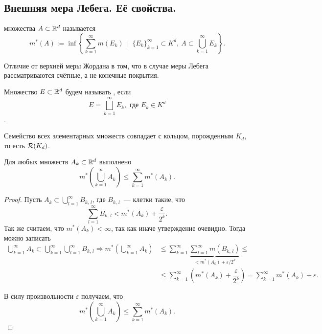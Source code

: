 \newpage
{}

\subsection{Внешняя мера Лебега. Её свойства.}

\begin{definition}
     множества $A\subset\mathbb{R}^d$ называется
    \[
        m^*(A):=\inf \left\{\sum_{k=1}^{\infty}m(E_k)\ \mid\ \{E_k\}_{k=1}^{\infty}\subset K^d,\ A\subset\bigcup_{k=1}^{\infty}E_k\right\}.
    \]
\end{definition}

\begin{remark}
    Отличие от верхней меры Жордана в том, что в случае меры Лебега рассматриваются счётные, а не конечные покрытия.
\end{remark}

\begin{definition}
    Множество $E\subset\mathbb{R}^d$ будем называть , если \[E=\bigsqcup\limits_{k=1}^{\infty}E_k, \text{ где } E_k\in K^d\].
\end{definition}

\begin{remark}
    Семейство всех элементарных множеств совпадает с кольцом, порожденным $K_d$, то есть $\mathcal{R}(K_d)$.
\end{remark}

\begin{claim}
    Для любых множеств $A_k\subset \mathbb{R}^d$ выполнено
    \[
        m^*\left(\bigcup_{k=1}^{\infty}A_k\right)\leqslant\sum_{k=1}^{\infty}m^*(A_k).
    \]

    \begin{proof}
        Пусть $A_k\subset\bigcup\limits_{l=1}^{\infty}B_{k,\,l}$, где $B_{k,\,l}$~--- клетки такие, что
        \[
            \sum_{l=1}^{\infty}B_{k,\,l}<m^*\left(A_k\right) + \dfrac{\varepsilon}{2^k}.
        \]
        Так же считаем, что $m^*(A_k)<\infty$, так как иначе утверждение очевидно. Тогда можно записать
        \begin{align*}
            \bigcup_{k=1}^{\infty}A_k\subset \bigcup_{k=1}^{\infty}\bigcup_{l=1}^{\infty}B_{k,\, l}\Rightarrow
            m^*\left(\bigcup_{k=1}^{\infty}A_k\right) & \leqslant \sum_{k=1}^{\infty}\underbrace{\sum_{l=1}^{\infty}m(B_{k,\, l})}_{<m^*(A_k)+\varepsilon/2^k}\leqslant \\
                                                      & \leqslant \sum_{k=1}^{\infty}\left(m^*(A_k)+\dfrac{\varepsilon}{2^k}\right)=
            \sum_{k=1}^{\infty}m^*(A_k)+\varepsilon.
        \end{align*}

        В силу произвольности $\varepsilon$ получаем, что
        \[
            m^*\left(\bigcup_{k=1}^{\infty}A_k\right)\leqslant \sum_{k=1}^{\infty}m^*(A_k).
        \]

    \end{proof}
\end{claim}

